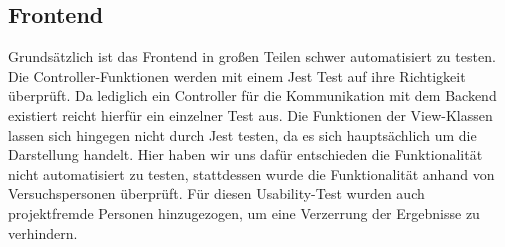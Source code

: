 \subsection{Frontend}
Grundsätzlich ist das Frontend in großen Teilen schwer automatisiert zu testen.
Die Controller-Funktionen werden mit einem Jest Test auf ihre Richtigkeit überprüft.
Da lediglich ein Controller für die Kommunikation mit dem Backend existiert reicht hierfür ein einzelner Test aus.
Die Funktionen der View-Klassen lassen sich hingegen nicht durch Jest testen, da es sich hauptsächlich um die Darstellung handelt.
Hier haben wir uns dafür entschieden die Funktionalität nicht automatisiert zu testen, stattdessen wurde die Funktionalität anhand von Versuchspersonen überprüft.
Für diesen Usability-Test wurden auch projektfremde Personen hinzugezogen, um eine Verzerrung der Ergebnisse zu verhindern.
